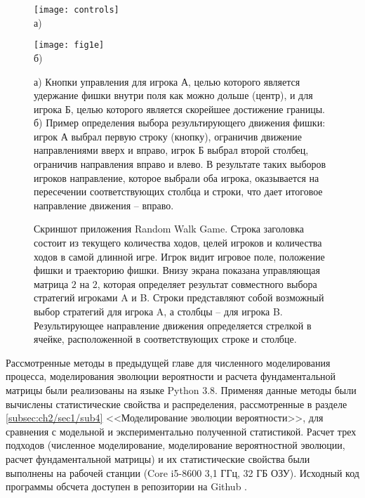 \begin{figure}[ht]
    \begin{minipage}[b][][b]{0.49\linewidth}\centering
        \texttt{[image: controls]} \\ а)
    \end{minipage}
    \hfill
    \begin{minipage}[b][][b]{0.49\linewidth}\centering
        \texttt{[image: fig1e]} \\ б)
    \end{minipage}
    \caption{
        а) Кнопки управления для игрока А, целью которого является удержание фишки внутри поля как можно дольше (центр),
        и для игрока Б, целью которого является скорейшее достижение границы.
        б) Пример определения выбора результирующего движения фишки: игрок А выбрал первую строку (кнопку), ограничив движение направлениями вверх и вправо,
        игрок Б выбрал второй столбец, ограничив направления вправо и влево. В результате таких выборов игроков направление, которое выбрали оба игрока,
        оказывается на пересечении соответствующих столбца и строки, что дает итоговое направление движения -- вправо.
    }\label{fig:controls}
\end{figure}


\begin{figure}[ht]
    \caption{
        Скриншот приложения Random Walk Game. Строка заголовка состоит из текущего количества ходов, 
        целей игроков и количества ходов в самой длинной игре. Игрок видит игровое поле, положение фишки и траекторию фишки. 
        Внизу экрана показана управляющая матрица $2$ на $2$, которая определяет результат совместного выбора стратегий игроками A и B. 
        Строки представляют собой возможный выбор стратегий для игрока A, а столбцы -- для игрока B. Результирующее направление движения 
        определяется стрелкой в ячейке, расположенной в соответствующих строке и столбце.
    }\label{fig:screenshot_game_field}
\end{figure}


Рассмотренные методы в предыдущей главе для численного моделирования процесса,
моделирования эволюции вероятности и расчета фундаментальной матрицы 
были реализованы на языке Python 3.8. 
Применяя данные методы были вычислены статистические свойства и распределения, 
рассмотренные в разделе \cref{subsec:ch2/sec1/sub4} <<Моделирование эволюции вероятности>>, для сравнения с модельной и экспериментально полученной статистикой. 
Расчет трех подходов (численное моделирование, моделирование вероятностной эволюции, расчет фундаментальной матрицы) 
и их статистические свойства были выполнены на рабочей станции (Core i5-8600 3,1 ГГц, 32 ГБ ОЗУ). 
Исходный код программы обсчета доступен в репозитории на Github \cite{RWAnalyzer}.

